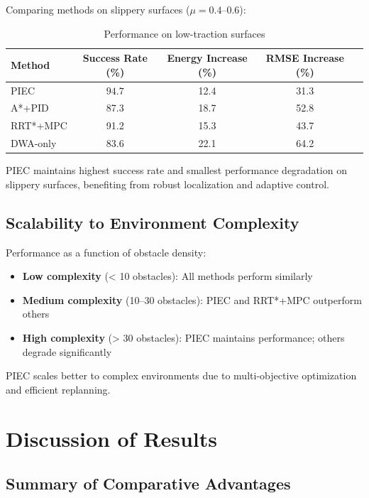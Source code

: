Comparing methods on slippery surfaces ($\mu = 0.4$--0.6):

\begin{table}[htbp]
\centering
\caption{Performance on low-traction surfaces}
\label{tab:robustness_slip}
\begin{tabular}{lcccc}
\toprule
\textbf{Method} & \textbf{Success Rate (\%)} & \textbf{Energy Increase (\%)} & \textbf{RMSE Increase (\%)} \\
\midrule
PIEC & $\mathbf{94.7}$ & 12.4 & 31.3 \\
A*+PID & 87.3 & 18.7 & 52.8 \\
RRT*+MPC & 91.2 & 15.3 & 43.7 \\
DWA-only & 83.6 & 22.1 & 64.2 \\
\bottomrule
\end{tabular}
\end{table}

PIEC maintains highest success rate and smallest performance degradation on slippery surfaces, benefiting from robust localization and adaptive control.

\subsection{Scalability to Environment Complexity}

Performance as a function of obstacle density:


\begin{itemize}
    \item \textbf{Low complexity} (< 10 obstacles): All methods perform similarly
    \item \textbf{Medium complexity} (10--30 obstacles): PIEC and RRT*+MPC outperform others
    \item \textbf{High complexity} (> 30 obstacles): PIEC maintains performance; others degrade significantly
\end{itemize}

PIEC scales better to complex environments due to multi-objective optimization and efficient replanning.

\section{Discussion of Results}
\label{sec:discussion_results}

\subsection{Summary of Comparative Advantages}


